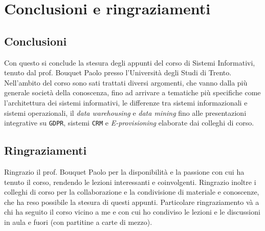 \chapter*{Conclusioni e ringraziamenti}
\thispagestyle{chapterInit}

\section*{Conclusioni}
Con questo si conclude la stesura degli appunti del corso di Sistemi Informativi, tenuto dal prof. Bouquet Paolo presso l'Università degli Studi di Trento. Nell'ambito del corso sono sati trattati diversi argomenti, che vanno dalla più generale società della conoscenza, fino ad arrivare a tematiche più specifiche come l'architettura dei sistemi informativi, le differenze tra sistemi informazionali e sistemi operazionali, il \textit{data warehousing} e \textit{data mining} fino alle presentazioni integrative su \texttt{GDPR}, sistemi \texttt{CRM} e \textit{E-provisioning} elaborate dai colleghi di corso.

\section*{Ringraziamenti}
Ringrazio il prof. Bouquet Paolo per la disponibilità e la passione con cui ha tenuto il corso, rendendo le lezioni interessanti e coinvolgenti. Ringrazio inoltre i colleghi di corso per la collaborazione e la condivisione di materiale e conoscenze, che ha reso possibile la stesura di questi appunti. Particolare ringraziamento và a chi ha seguito il corso vicino a me e con cui ho condiviso le lezioni e le discussioni in aula e fuori (con partitine a carte di mezzo). 

